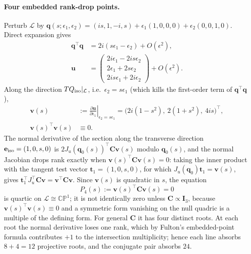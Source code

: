 \paragraph{Four embedded rank-drop points.} Perturb $\mathcal L$ by $\mathbf q(s;\epsilon_1,\epsilon_2)=(is,1,-i,s)+\epsilon_1(1,0,0,0)+\epsilon_2(0,0,1,0)$. Direct expansion gives
\begin{equation}
\begin{aligned}
\mathbf q^\top\mathbf q&=2i(s\epsilon_1-\epsilon_2)+O(\epsilon^2),\\
\mathbf u&=\begin{pmatrix}2i\epsilon_1-2is\epsilon_2\\ 2\epsilon_1+2s\epsilon_2\\ 2is\epsilon_1+2i\epsilon_2\end{pmatrix}+O(\epsilon^2).
\end{aligned}
\end{equation}
Along the direction $TQ_{\rm iso}|_{\mathcal L}$, i.e.\ $\epsilon_2=s\epsilon_1$ (which kills the first-order term of $\mathbf q^\top\mathbf q$),
\begin{equation}
\begin{aligned}
\mathbf v(s)&:=\left.\frac{\partial\mathbf u}{\partial\epsilon_1}\right|_{\epsilon_2=s\epsilon_1}
=\big(2i(1-s^2),\ 2(1+s^2),\ 4is\big)^\top,\\
\mathbf v(s)^\top\mathbf v(s)&\equiv0 .
\end{aligned}
\end{equation}
The normal derivative of the section along the transverse direction $\mathbf e_{\rm iso}=(1,0,s,0)$ is $2J_u(\mathbf q_0(s))^\top\mathbf C\mathbf v(s)$ modulo $\mathbf q_0(s)$, and the normal Jacobian drops rank exactly when $\mathbf v(s)^\top\mathbf C\mathbf v(s)=0$: taking the inner product with the tangent test vector $\mathbf t_1=(1,0,s,0)$, for which $J_u(\mathbf q_0)\mathbf t_1=\mathbf v(s)$, gives $\mathbf t_1^\top J_u^\top\mathbf C\mathbf v=\mathbf v^\top\mathbf C\mathbf v$. Since $\mathbf v(s)$ is quadratic in $s$, the equation
\[
P_4(s):=\mathbf v(s)^\top\mathbf C\mathbf v(s)=0
\]
is quartic on $\mathcal L\cong\mathbb{CP}^1$; it is not identically zero unless $\mathbf C\propto\mathbf I_3$, because $\mathbf v(s)^\top\mathbf v(s)\equiv0$ and a symmetric form vanishing on the null quadric is a multiple of the defining form. For general $\mathbf C$ it has four distinct roots. At each root the normal derivative loses one rank, which by Fulton's embedded-point formula contributes $+1$ to the intersection multiplicity; hence each line absorbs $8+4=12$ projective roots, and the conjugate pair absorbs $24$.

